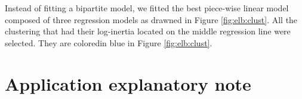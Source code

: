 \begin{appendices}
Instead of fitting a bipartite model, we fitted the best piece-wise linear model composed of three regression models as drawned in Figure \ref{fig:elb:clust}. All the clustering that had their log-inertia located on the middle regression line were selected. They are coloredin blue in Figure \ref{fig:elb:clust}.    

\section{Application explanatory note}\label{app:chap6:2}



\end{appendices}